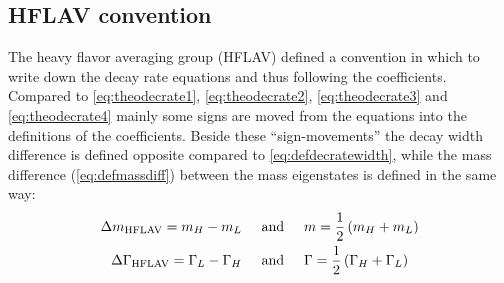 \subsection{HFLAV convention}
\label{sec:HFLAVconv}

The heavy flavor averaging group (HFLAV) defined a convention in which to write down the decay rate equations and thus following
the \CP coefficients. Compared to \cref{eq:theodecrate1}, \cref{eq:theodecrate2}, \cref{eq:theodecrate3} and \cref{eq:theodecrate4}
mainly some signs are moved from the equations into the definitions of the \CP coefficients. Beside these \enquote{sign-movements}
the decay width difference is defined opposite compared to \cref{eq:defdecratewidth}, while the mass difference (\cref{eq:defmassdiff})
between the mass eigenstates is defined in the same way:
\begin{align}
    \Delta m_{\text{HFLAV}} = m_H - m_L \hspace{0.5cm} &\text{and} \hspace{0.5cm} m = \frac{1}{2}\left(m_H+ m_L\right)\\
    \Delta \Gamma_{\text{HFLAV}} = \Gamma_L - \Gamma_H \hspace{0.5cm} &\text{and} \hspace{0.5cm} \Gamma = \frac{1}{2}\left(\Gamma_H + \Gamma_L\right)
\end{align}

